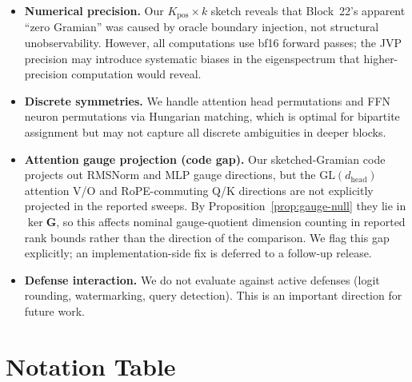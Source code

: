 \documentclass{article}
\newcommand{\bG}{\mathbf{G}}
\begin{document}
\begin{itemize}
 \item \textbf{Numerical precision.} Our $K_{\text{pos}}\times k$ sketch reveals that Block~22's apparent ``zero Gramian'' was caused by oracle boundary injection, not structural unobservability. However, all computations use bf16 forward passes; the JVP precision may introduce systematic biases in the eigenspectrum that higher-precision computation would reveal.
 \item \textbf{Discrete symmetries.} We handle attention head permutations and FFN neuron permutations via Hungarian matching, which is optimal for bipartite assignment but may not capture all discrete ambiguities in deeper blocks.
 \item \textbf{Attention gauge projection (code gap).} Our sketched-Gramian code projects out RMSNorm and MLP gauge directions, but the $\mathrm{GL}(d_\text{head})$ attention V/O and RoPE-commuting Q/K directions are not explicitly projected in the reported sweeps. By Proposition~\ref{prop:gauge-null} they lie in $\ker\bG$, so this affects nominal gauge-quotient dimension counting in reported rank bounds rather than the direction of the comparison. We flag this gap explicitly; an implementation-side fix is deferred to a follow-up release.
 \item \textbf{Defense interaction.} We do not evaluate against active defenses (logit rounding, watermarking, query detection). This is an important direction for future work.
\end{itemize}





\appendix

\section{Notation Table}
\label{app:notation}
\end{document}
